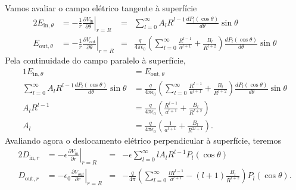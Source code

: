 \documentclass{article}
\begin{document}
Vamos avaliar o campo elétrico tangente à superfície
\begin{alignat}{2}
 E_{\mathrm{in},\theta} &= \left. -\frac{1}{r}\frac{\partial V_{\mathrm{in}}}{\partial \theta} \right\rvert_{r = R} &=&
 \sum_{l = 0}^{\infty} A_l R^{l-1} \frac{d P_l (\cos{\theta})}{d \theta} \sin{\theta}\\
 E_{\mathrm{out},\theta} &= \left. -\frac{1}{r}\frac{\partial V_{\mathrm{out}}}{\partial \theta} \right\rvert_{r = R} &=& 
 \frac{q}{4 \pi \epsilon_0} \left( \sum_{l = 0}^{\infty} \frac{R^{l-1}}{a^{l+1}} + \frac{B_l}{R^{l+2}} \right) \frac{dP_l (\cos{\theta})}{d\theta}\sin{\theta}
\end{alignat}
Pela continuidade do campo paralelo à superfície,
\begin{alignat}{1}
 E_{\mathrm{in},\theta} &= E_{\mathrm{out},\theta} \\
 \sum_{l = 0}^{\infty} A_l R^{l-1} \frac{d P_l (\cos{\theta})}{d \theta} \sin{\theta} &=
 \frac{q}{4 \pi \epsilon_0} \left( \sum_{l = 0}^{\infty} \frac{R^{l-1}}{a^{l+1}} + \frac{B_l}{R^{l+2}} \right) \frac{dP_l (\cos{\theta})}{d\theta}\sin{\theta}\\
 A_l R^{l-1} &= \frac{q}{4 \pi \epsilon_0} \left( \frac{R^{l-1}}{a^{l+1}} + \frac{B_l}{R^{l+2}} \right) \\
 A_l &= \frac{q}{4 \pi \epsilon_0} \left( \frac{1}{a^{l+1}} + \frac{B_l}{R^{2l+1}} \right)\mathrm{.}
\end{alignat}
Avaliando agora o deslocamento elétrico perpendicular à superfície, teremos
\begin{alignat}{2}
 D_{\mathrm{in},r} &= \left. -\epsilon \frac{\partial V_{in}}{\partial r} \right\rvert_{r = R} &=&
 - \epsilon \sum_{l = 0}^{\infty} l A_l R^{l-1} P_l (\cos{\theta}) \\
 D_{\mathrm{out},r} &= \left. -\epsilon_0 \frac{\partial V_{out}}{\partial r} \right\rvert_{r = R} &=&
 -\frac{q}{4 \pi} \left( \sum_{l = 0}^{\infty} \frac{lR^{l-1}}{a^{l+1}} -(l+1) \frac{B_l}{R^{l+2}} \right) P_l (\cos{\theta})\mathrm{.}
\end{alignat}
\end{document}
